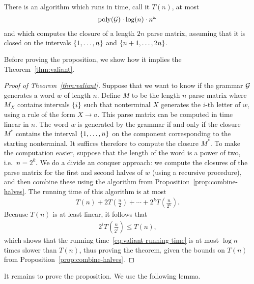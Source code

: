 \begin{proposition}\label{prop:combine-halves}
There is an algorithm which runs in time, call it $T(n)$,  at most
\begin{align*}
\mathrm{poly}(\mathcal{G}) \cdot \log(n) \cdot n^\omega
\end{align*}
and which computes the closure of a length $2n$ parse matrix,  assuming that it is closed on the intervals $\{1,\ldots,n\}$ and $\{n+1,\ldots,2n\}$.
\end{proposition}

Before proving the proposition, we show how it implies the Theorem~\ref{thm:valiant}.

\begin{proof}[Proof of Theorem~\ref{thm:valiant}]
Suppose that we want to know if the grammar $\mathcal{G}$ generates a word $w$ of length $n$. Define $M$ to be the length $n$ parse matrix where $M_X$ contains intervals $\{i\}$ such that nonterminal $X$ generates the $i$-th letter of $w$, using a rule of the form $X \to a$.
This parse matrix can be computed in time linear in $n$. 
The word $w$ is generated by the grammar if and only if the closure $M^*$ contains the interval  $\{1,\ldots,n\}$ on the component corresponding to the starting nonterminal. It suffices therefore to compute the closure $M^*$. To make the computation easier, suppose that the length of the word is a power of two, i.e.~$n=2^k$. We do a divide an conquer approach: we compute the closures of the parse matrix for the first and second halves of $w$  (using a recursive procedure), and then combine these using the algorithm from Proposition~\ref{prop:combine-halves}. The running time of this algorithm is at most
\begin{align}\label{eq:valiant-running-time}
  T(n) + 2T(\frac n 2) + \cdots + 2^k T(\frac n {2^k}).
\end{align}	
Because $T(n)$ is at least linear, it follows that
\begin{align*}
  2^i T(\frac n {2^i}) \le T(n),
\end{align*}
which shows that the running time~\eqref{eq:valiant-running-time} is at most $\log n$ times slower than $T(n)$, thus proving the theorem, given the bounds on $T(n)$ from Proposition~\ref{prop:combine-halves}. \end{proof}

It remains to prove the proposition. We use the following lemma.



